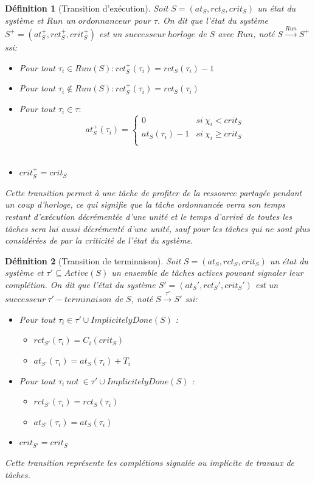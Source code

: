 \documentclass[a4paper]{report}
\theoremstyle{break}
\newtheorem{defin}{Définition}
\begin{document}
\begin{defin}[Transition d'exécution]
Soit $S = (at_S, rct_S, crit_S)$ un état du système et $Run$ un $ordonnanceur$ pour $\tau$. On dit que l'état du système $S^+ = (at_S^+, rct_S^+, crit_S^+)$ est un $successeur\ horloge$ de $S$ avec $Run$, noté $S\xrightarrow{Run}S^+$ ssi:
\begin{itemize}
\item Pour tout $\tau_i \in Run(S) : rct_S^+(\tau_i) = rct_S(\tau_i)-1$\\
\item Pour tout $\tau_i \not \in Run(S) : rct_S^+(\tau_i) = rct_S(\tau_i)$\\
\item Pour tout $\tau_i \in \tau :$
$$ at_S^+(\tau_i) = \left\{
    \begin{array}{ll}
        0 & si\ \chi_i < crit_S \\
        at_S(\tau_i)-1 & si\ \chi_i \geq crit_S \\
    \end{array}
\right.
$$\\
\item $crit_{S}^{+} = crit_{S}$

\end{itemize}
Cette transition permet à une tâche de profiter de la ressource partagée pendant un coup d'horloge, ce qui signifie que la tâche ordonnancée verra son temps restant d'exécution décrémentée d'une unité et le temps d'arrivé de toutes les tâches sera lui aussi décrémenté d'une unité, sauf pour les tâches qui ne sont plus considérées de par la criticité de l'état du système.
\end{defin}

\begin{defin}[Transition de terminaison]
Soit $S = (at_S, rct_S, crit_S)$ un état du système et $\tau' \subseteq Active(S)$ un ensemble de tâches actives pouvant signaler leur complétion. On dit que l'état du système $S' = (at_S', rct_S', crit_S')$ est un $successeur\ \tau'-terminaison$ de $S$, noté $S\xrightarrow{\tau'}S'$ ssi:
\begin{itemize}
\item Pour tout $\tau_i \in \tau' \cup ImplicitelyDone(S)$ :\begin{itemize}
\item $rct_{S'}(\tau_i) = C_i(crit_S)$
\item $at_{S'}(\tau_i) = at_{S}(\tau_i)+T_i$
\end{itemize}

\item Pour tout $\tau_i\ not\ \in \tau' \cup ImplicitelyDone(S)$ :\begin{itemize}
\item $rct_{S'}(\tau_i) = rct_{S}(\tau_i)$
\item $at_{S'}(\tau_i) = at_{S}(\tau_i)$
\end{itemize}
\item $crit_{S'} = crit_{S}$

\end{itemize}
Cette transition représente les complétions signalée ou implicite de travaux de tâches.
\end{defin}
\end{document}
